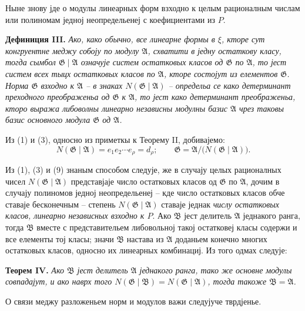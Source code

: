 \documentclass[11pt]{article}
\providecommand{\Amod}{\mathfrak A}
\providecommand{\Bmod}{\mathfrak B}
\providecommand{\Gmod}{\mathfrak G}
\providecommand{\Norm}{N}
\begin{document}
Ныне знову јде о модулы линеарных форм взходно к целым рационалным числам или полиномам једној неопредельенеј с коефициентами из $P$.

\medskip
\noindent\textbf{Дефиниция III.} \emph{Ако, како обычно, все линеарне формы в $\xi$, кторе сут конгруентне меджу собоју по модулу $\Amod$, схватити в једну остаткову класу, тогда сымбол $\Gmod\mid\Amod$ означује систем остатковых класов од $\Gmod$ по $\Amod$, то јест систем всех тыцх остатковых класов по $\Amod$, кторе состојут из елементов $\Gmod$. Норма $\Gmod$ взходно к $\Amod$ -- в знаках $\Norm(\Gmod\mid\Amod)$ -- определьа се како детерминант преходного преображеньа од $\Gmod$ к $\Amod$, то јест како детерминант преображеньа, кторо выража либоволны линеарно независны модулны базис $\Amod$ чрез таковы базис основного модула $\Gmod$ од $\Amod$.}

Из (1) и (3), односно из приметкы к Теорему II, добивајемо:
\begin{equation}
 \Norm(\Gmod\mid\Amod)=e_1e_2\cdots e_\rho=d_\rho;
 \qquad
 \Gmod=\Amod/\bigl(\Norm(\Gmod\mid\Amod)\bigr).
\tag{9}
\end{equation}

Из (1), (3) и (9) знаным способом следује, же в случају целых рационалных чисел $\Norm(\Gmod\mid\Amod)$ представјаје число остатковых класов од $\Gmod$ по $\Amod$, дочим в случају полиномов једној неопредельенеј -- кде число остатковых класов обче ставаје бесконечным -- степень $\Norm(\Gmod\mid\Amod)$ ставаје једнак \emph{числу остатковых класов, линеарно независных взходно к $P$}. Ако $\Bmod$ јест делитель $\Amod$ једнакого ранга, тогда $\Bmod$ вместе с представительем либовольној такој остатковеј класы содержи и все елементы тој класы; значи $\Bmod$ настава из $\Amod$ доданьем конечно многих остатковых класов, односно их линеарных комбинациј. Из того одмах следује:

\medskip
\noindent\textbf{Теорем IV.} \emph{Ако $\Bmod$ јест делитель $\Amod$ једнакого ранга, тако же основне модулы совпадајут, и ако наврх того $\Norm(\Gmod\mid\Bmod)=\Norm(\Gmod\mid\Amod)$, тогда такоже $\Bmod=\Amod$.}

О связи меджу разложеньем норм и модулов важи следујуче тврдјенье.
\end{document}
